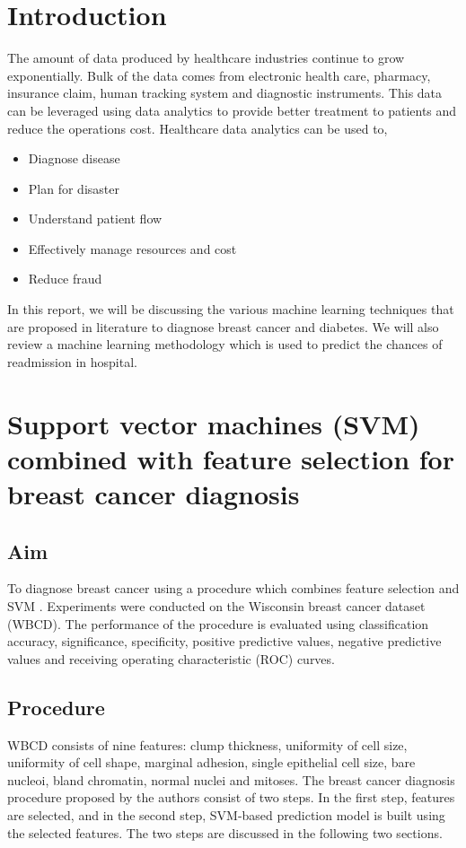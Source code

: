 \documentclass[twoside]{iitbreport}
\begin{document}
\section{Introduction}
The amount of data produced by healthcare industries continue to grow exponentially. Bulk of the data comes from electronic health care, pharmacy, insurance claim, human tracking system and diagnostic instruments. This data can be leveraged using data analytics to provide better treatment to patients and reduce the operations cost. Healthcare data analytics can be used to,
\begin{itemize}
\item Diagnose disease
\item Plan for disaster
\item Understand patient flow
\item Effectively manage resources and cost
\item Reduce fraud  
\end{itemize} 
In this report, we will be discussing the various machine learning techniques that are proposed in literature to diagnose breast cancer and diabetes. We will also review a machine learning methodology which is used to predict the chances of readmission in hospital.   

\section{Support vector machines (SVM) combined with feature selection for breast cancer diagnosis}
\subsection{Aim}
To diagnose breast cancer using a procedure which combines feature selection and SVM \cite{akay2009support}. Experiments were conducted on the Wisconsin breast cancer dataset (WBCD). The performance of the procedure is evaluated using classification accuracy, significance, specificity, positive predictive values, negative predictive values and receiving operating characteristic (ROC) curves.

\subsection{Procedure}
WBCD consists of nine features: clump thickness, uniformity of cell size, uniformity of cell shape, marginal adhesion, single epithelial cell size, bare nucleoi, bland chromatin, normal nuclei and mitoses. The breast cancer diagnosis procedure proposed by the authors consist of two steps. In the first step, features are selected, and in the second step, SVM-based prediction model is built using the selected features. The two steps are discussed in the following two sections.  
\end{document}

